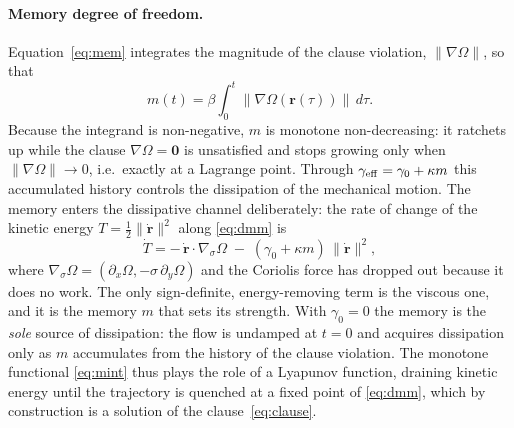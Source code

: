 \documentclass[aip,preprint,amsmath,amssymb,floatfix]{revtex4-2}
\begin{document}
\paragraph{Memory degree of freedom.}
Equation~\eqref{eq:mem} integrates the magnitude of the clause violation,
$\lVert\nabla\Omega\rVert$, so that
\begin{equation}
  m(t)=\beta\!\int_0^t\!\lVert\nabla\Omega(\mathbf r(\tau))\rVert\,d\tau .
  \label{eq:mint}
\end{equation}
Because the integrand is non-negative, $m$ is monotone non-decreasing: it ratchets
up while the clause $\nabla\Omega=\mathbf 0$ is unsatisfied and stops growing only
when $\lVert\nabla\Omega\rVert\to0$, i.e.\ exactly at a Lagrange point. Through
$\gamma_{\rm eff}=\gamma_0+\kappa m$ this accumulated history controls the
dissipation of the mechanical motion. The memory enters the dissipative channel
deliberately: the rate of change of the kinetic energy
$T=\tfrac12\lVert\dot{\mathbf r}\rVert^2$ along \eqref{eq:dmm} is
\begin{equation}
  \dot T = -\,\dot{\mathbf r}\!\cdot\!\nabla_{\!\sigma}\Omega
           \;-\;(\gamma_0+\kappa m)\,\lVert\dot{\mathbf r}\rVert^2 ,
  \label{eq:Tdot}
\end{equation}
where $\nabla_{\!\sigma}\Omega=(\partial_x\Omega,-\sigma\,\partial_y\Omega)$ and
the Coriolis force has dropped out because it does no work. The only
sign-definite, energy-removing term is the viscous one, and it is the memory $m$
that sets its strength. With $\gamma_0=0$ the memory is the \emph{sole} source of
dissipation: the flow is undamped at $t=0$ and acquires dissipation only as $m$
accumulates from the history of the clause violation. The monotone functional
\eqref{eq:mint} thus plays the role of a Lyapunov function, draining kinetic
energy until the trajectory is quenched at a fixed point of \eqref{eq:dmm}, which
by construction is a solution of the clause~\eqref{eq:clause}.
\end{document}

